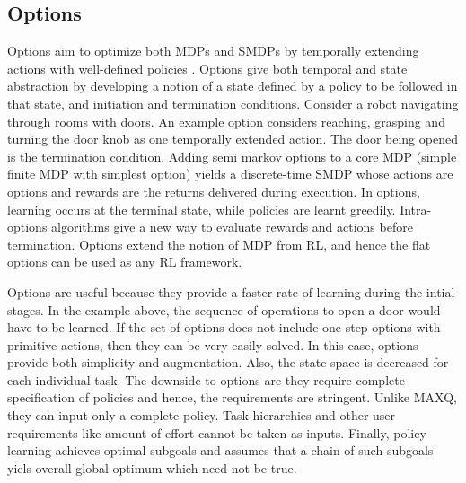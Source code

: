 \subsection{Options}

Options aim to optimize both MDPs and SMDPs by temporally
extending actions with well-defined policies \cite{Sutton}. Options give both temporal and state abstraction by developing a notion of a
state defined by a policy to be followed in that state, and initiation and termination
conditions. Consider a robot navigating through rooms with doors. An example option considers
reaching, grasping and turning the door knob as one temporally extended action. The door being
opened is the termination condition. Adding semi markov options to a core MDP (simple finite MDP with simplest option) yields a
discrete-time SMDP whose actions are options and rewards are the returns
delivered during execution. In options, learning occurs at the terminal state, while policies are learnt
greedily. Intra-options algorithms give a new way to evaluate rewards and
actions before termination. Options extend the notion of MDP from RL, and hence the flat options can be used as any RL framework.


Options are useful because they provide a faster rate of learning during the intial stages. In the example above, the sequence of operations to open a door would have to be learned. If the set of options does not include one-step options with primitive actions, then they can be very easily solved. In this case, options provide both simplicity and augmentation. Also, the state space is decreased for each individual task. The downside to options are they require complete specification of policies and hence, the requirements are stringent. Unlike MAXQ, they can input only a complete policy. Task hierarchies and other user requirements like amount of effort cannot be taken as inputs. Finally, policy learning achieves optimal subgoals and assumes that a chain of such subgoals yiels overall global optimum which need not be true.
